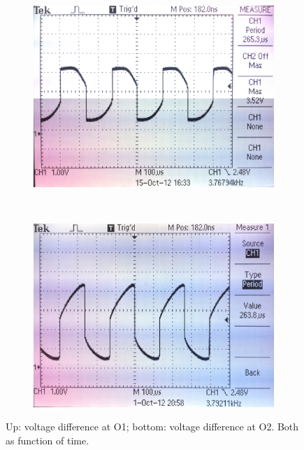 \documentclass[journal]{IEEEtran}
\begin{document}
\begin{figure}
	\begin{subfigure}[b]{\columnwidth}
		\centering
		\includegraphics[width=\textwidth]{img/am_o1_timing.jpg}
	\end{subfigure} \\
	\begin{subfigure}[b]{\columnwidth}
		\centering
		\includegraphics[width=\textwidth]{img/am_o2_timing.png}
	\end{subfigure}
	\caption{Up: voltage difference at O1; bottom: voltage difference at O2. Both
	as function of time.}
	\label{fig:am_timing}
\end{figure}
\end{document}
